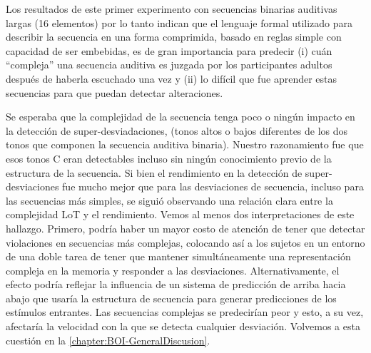 Los resultados de este primer experimento con secuencias binarias auditivas largas (16 elementos) por lo tanto indican que el lenguaje formal utilizado para describir la secuencia en una forma comprimida, basado en reglas simple con capacidad de ser embebidas, es de gran importancia para predecir (i) cuán ``compleja'' una secuencia auditiva es juzgada por los participantes adultos después de haberla escuchado una vez y (ii) lo difícil que fue aprender estas secuencias para que puedan detectar alteraciones.


Se esperaba que la complejidad de la secuencia tenga poco o ningún impacto en la detección de super-desviadaciones, (tonos altos o bajos diferentes de los dos tonos que componen la secuencia auditiva binaria). Nuestro razonamiento fue que esos tonos C eran detectables incluso sin ningún conocimiento previo de la estructura de la secuencia. Si bien el rendimiento en la detección de super-desviaciones fue mucho mejor que para las desviaciones de secuencia, incluso para las secuencias más simples, se siguió observando una relación clara entre la complejidad LoT y el rendimiento. Vemos al menos dos interpretaciones de este hallazgo. Primero, podría haber un mayor costo de atención de tener que detectar violaciones en secuencias más complejas, colocando así a los sujetos en un entorno de una doble tarea de tener que mantener simultáneamente una representación compleja en la memoria y responder a las desviaciones. Alternativamente, el efecto podría reflejar la influencia de un sistema de predicción de arriba hacia abajo que usaría la estructura de secuencia para generar predicciones de los estímulos entrantes. Las secuencias complejas se predecirían peor y esto, a su vez, afectaría la velocidad con la que se detecta cualquier desviación. Volvemos a esta cuestión en la \ref{chapter:BOI-GeneralDiscusion}.

